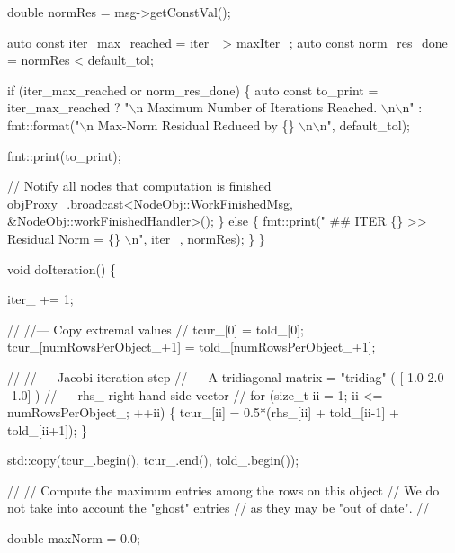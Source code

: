 \begin{DoxyCodeInclude}
    \textcolor{keywordtype}{double} normRes = msg->getConstVal();

    \textcolor{keyword}{auto} \textcolor{keyword}{const} iter\_max\_reached = iter\_ > maxIter\_;
    \textcolor{keyword}{auto} \textcolor{keyword}{const} norm\_res\_done = normRes < default\_tol;

    \textcolor{keywordflow}{if} (iter\_max\_reached or norm\_res\_done) \{
      \textcolor{keyword}{auto} \textcolor{keyword}{const} to\_print = iter\_max\_reached ?
        \textcolor{stringliteral}{"\(\backslash\)n Maximum Number of Iterations Reached. \(\backslash\)n\(\backslash\)n"} :
        fmt::format(\textcolor{stringliteral}{"\(\backslash\)n Max-Norm Residual Reduced by \{\} \(\backslash\)n\(\backslash\)n"}, default\_tol);

      fmt::print(to\_print);

      \textcolor{comment}{// Notify all nodes that computation is finished}
      objProxy\_.broadcast<NodeObj::WorkFinishedMsg, &NodeObj::workFinishedHandler>();
    \} \textcolor{keywordflow}{else} \{
      fmt::print(\textcolor{stringliteral}{" ## ITER \{\} >> Residual Norm = \{\} \(\backslash\)n"}, iter\_, normRes);
    \}
  \}

  \textcolor{keywordtype}{void} doIteration() \{

    iter\_ += 1;

    \textcolor{comment}{//}
    \textcolor{comment}{//--- Copy extremal values}
    \textcolor{comment}{//}
    tcur\_[0] = told\_[0];
    tcur\_[numRowsPerObject\_+1] = told\_[numRowsPerObject\_+1];

    \textcolor{comment}{//}
    \textcolor{comment}{//---- Jacobi iteration step}
    \textcolor{comment}{//---- A tridiagonal matrix = "tridiag" ( [-1.0  2.0  -1.0] )}
    \textcolor{comment}{//---- rhs\_ right hand side vector}
    \textcolor{comment}{//}
    \textcolor{keywordflow}{for} (\textcolor{keywordtype}{size\_t} ii = 1; ii <= numRowsPerObject\_; ++ii) \{
      tcur\_[ii] = 0.5*(rhs\_[ii] + told\_[ii-1] + told\_[ii+1]);
    \}

    std::copy(tcur\_.begin(), tcur\_.end(), told\_.begin());

    \textcolor{comment}{//}
    \textcolor{comment}{// Compute the maximum entries among the rows on this object}
    \textcolor{comment}{// We do not take into account the "ghost" entries}
    \textcolor{comment}{// as they may be "out of date".}
    \textcolor{comment}{//}

    \textcolor{keywordtype}{double} maxNorm = 0.0;


\end{DoxyCodeInclude}
